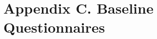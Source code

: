 
\chapter{Appendix C. Baseline Questionnaires} %
\clearpage
\label{AppendixC} %


\clearpage


%

% 
